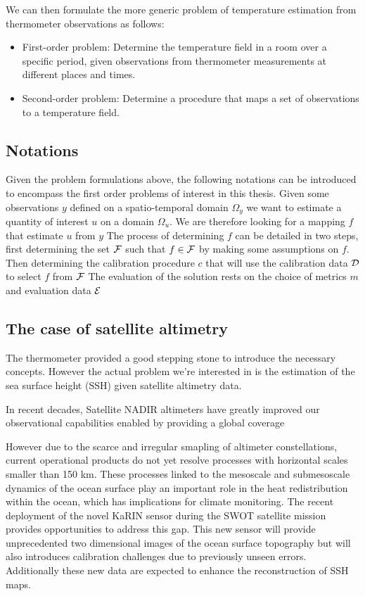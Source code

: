 \begin{bibunit}
We can then formulate the more generic problem of temperature estimation from thermometer observations as follows:

\begin{itemize}
    \item First-order problem: Determine the temperature field in a room over a specific period, given observations from thermometer measurements at different places and times.
    \item Second-order problem: Determine a procedure that maps a set of observations to a temperature field.
\end{itemize}

\subsection{Notations}
Given the problem formulations above, the following notations can be introduced to encompass the first order problems of interest in this thesis.
Given some observations $y$ defined on a spatio-temporal domain $\Omega_y$ we want to estimate a quantity of interest $u$ on a domain $\Omega_u$. We are therefore looking for a mapping $f$ that estimate $u$ from $y$
The process of determining $f$ can be detailed in two steps, first determining the set $\cal{F}$ such that $f \in \cal{F}$ by making some assumptions on $f$. Then determining the calibration procedure $c$ that will use the calibration data $\cal{D}$ to select $f$ from $\cal{F}$
The evaluation of the solution rests on the choice of metrics $m$ and evaluation data $\cal{E}$

\subsection{The case of satellite altimetry}
The thermometer provided a good stepping stone to introduce the necessary concepts.
However the actual problem we're interested in is the estimation of the sea surface height (SSH) given satellite altimetry data.

In recent decades, Satellite NADIR altimeters have greatly improved our observational capabilities enabled by providing a global coverage 

However due to the scarce and irregular smapling of altimeter constellations, current operational products do not yet resolve processes with horizontal scales smaller than 150 km\cite{}.
These processes linked to the mesoscale and submesoscale dynamics of the ocean surface play an important role in the heat redistribution within the ocean, which has implications for climate monitoring.
The recent deployment of the novel KaRIN sensor during the SWOT satellite mission\cite{} provides opportunities to address this gap.
This new sensor will provide unprecedented two dimensional images of the ocean surface topography but will also introduces calibration challenges\cite{} due to previously unseen errors.
Additionally these new data are expected to enhance the reconstruction of SSH maps.


\end{bibunit}
